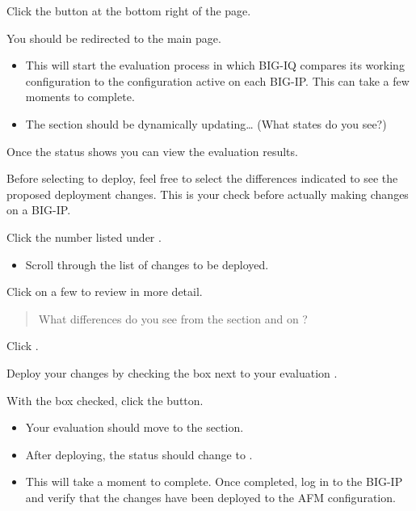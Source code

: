 \documentclass[letterpaper,10pt,english]{sphinxmanual}
\begin{document}
Click the  button at the bottom right of the page.

You should be redirected to the main  page.
\begin{itemize}
\item {} 
This will start the evaluation process in which BIG-IQ compares its
working configuration to the configuration active on each BIG-IP.
This can take a few moments to complete.

\item {} 
The  section should be dynamically updating… (What states
do you see?)

\end{itemize}

Once the status shows  you can view the
evaluation results.

Before selecting to deploy, feel free to select the differences
indicated to see the proposed deployment changes. This is your check
before actually making changes on a BIG-IP.

Click the number listed under .
\begin{itemize}
\item {} 
Scroll through the list of changes to be deployed.

\end{itemize}

Click on a few to review in more detail.

\begin{quote}

What differences do you see from the  section
and on ?
\end{quote}

Click .

Deploy your changes by checking the box next to your evaluation
.

With the box checked, click the  button.
\begin{itemize}
\item {} 
Your evaluation should move to the  section.

\item {} 
After deploying, the status should change to .

\item {} 
This will take a moment to complete. Once completed, log in to the
BIG-IP and verify that the changes have been deployed to the AFM
configuration.

\end{itemize}
\end{document}
